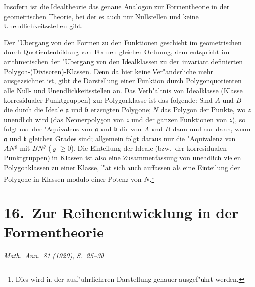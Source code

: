 \documentclass[12pt,a4paper]{article}
\begin{document}
Insofern ist die Idealtheorie das genaue Analogon zur Formentheorie in der geometrischen Theorie, bei der es auch nur Nullstellen und keine Unendlichkeitsstellen gibt.

Der "Ubergang von den Formen zu den Funktionen geschieht im geometrischen durch Quotientenbildung von Formen gleicher Ordnung; dem entspricht im arithmetischen der "Ubergang von den Idealklassen zu den invariant definierten Polygon-(Divisoren)-Klassen. Denn da hier keine Ver"anderliche mehr ausgezeichnet ist, gibt die Darstellung einer Funktion durch Polygonquotienten alle Null- und Unendlichkeitsstellen an. Das Verh"altnis von Idealklasse (Klasse korresidualer Punktgruppen) zur Polygonklasse ist das folgende: Sind $A$ und $B$ die durch die Ideale $\mathfrak{a}$ und $\mathfrak{b}$ erzeugten Polygone; $N$ das Polygon der Punkte, wo $z$ unendlich wird (das Nennerpolygon von $z$ und der ganzen Funktionen von $z$), so folgt aus der "Aquivalenz von $\mathfrak{a}$ und $\mathfrak{b}$ die von $A$ und $B$ dann und nur dann, wenn $\mathfrak{a}$ und $\mathfrak{b}$ gleichen Grades sind; allgemein folgt daraus nur die "Aquivalenz von $AN^\varrho$ mit $BN^\varrho$ ($\varrho \geq 0$). Die Einteilung der Ideale (bzw.\ der korresidualen Punktgruppen) in Klassen ist also eine Zusammenfassung von unendlich vielen Polygonklassen zu einer Klasse, l"at sich auch auffassen als eine Einteilung der Polygone in Klassen modulo einer Potenz von $N$.\footnote{Dies wird in der ausf"uhrlicheren Darstellung genauer ausgef"uhrt werden.}

\newpage

\section*{16.\ Zur Reihenentwicklung in der Formentheorie}
\begin{flushright}
\textit{Math.\ Ann.\ 81 (1920), S.~25--30}
\end{flushright}
\end{document}
